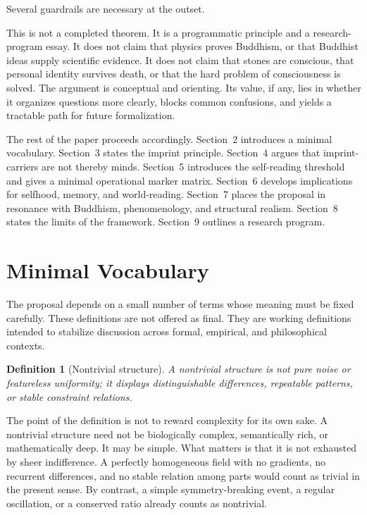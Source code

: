 \documentclass[12pt]{article}
\newtheorem{definition}{Definition}[section]
\begin{document}
Several guardrails are necessary at the outset.

This is not a completed theorem. It is a programmatic principle and a research-program essay. It does not claim that physics proves Buddhism, or that Buddhist ideas supply scientific evidence. It does not claim that stones are conscious, that personal identity survives death, or that the hard problem of consciousness is solved. The argument is conceptual and orienting. Its value, if any, lies in whether it organizes questions more clearly, blocks common confusions, and yields a tractable path for future formalization.

The rest of the paper proceeds accordingly. Section~2 introduces a minimal vocabulary. Section~3 states the imprint principle. Section~4 argues that imprint-carriers are not thereby minds. Section~5 introduces the self-reading threshold and gives a minimal operational marker matrix. Section~6 develops implications for selfhood, memory, and world-reading. Section~7 places the proposal in resonance with Buddhism, phenomenology, and structural realism. Section~8 states the limits of the framework. Section~9 outlines a research program.

\section{Minimal Vocabulary}

The proposal depends on a small number of terms whose meaning must be fixed carefully. These definitions are not offered as final. They are working definitions intended to stabilize discussion across formal, empirical, and philosophical contexts.

\begin{definition}[Nontrivial structure]
A \emph{nontrivial structure} is not pure noise or featureless uniformity; it displays distinguishable differences, repeatable patterns, or stable constraint relations.
\end{definition}

The point of the definition is not to reward complexity for its own sake. A nontrivial structure need not be biologically complex, semantically rich, or mathematically deep. It may be simple. What matters is that it is not exhausted by sheer indifference. A perfectly homogeneous field with no gradients, no recurrent differences, and no stable relation among parts would count as trivial in the present sense. By contrast, a simple symmetry-breaking event, a regular oscillation, or a conserved ratio already counts as nontrivial.
\end{document}
